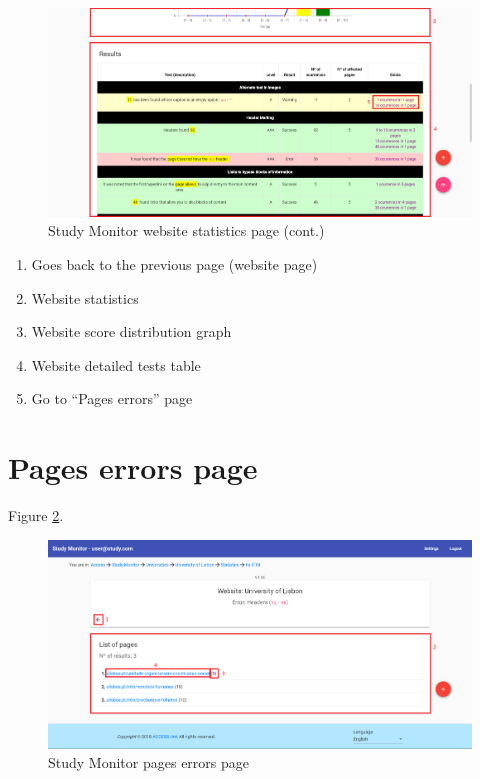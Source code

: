 \begin{figure}[H]
    \centering
    \includegraphics[width=\linewidth]{lib/images/study/study_website_statistics_page_3.png}
    \caption{Study Monitor website statistics page (cont.)}
    \label{fig:study_website_statistics_page_3}
\end{figure}

\begin{enumerate}
    \item Goes back to the previous page (website page)
    \item Website statistics
    \item Website score distribution graph
    \item Website detailed tests table
    \item Go to ``Pages errors'' page
\end{enumerate}

\section{Pages errors page}

Figure \ref{fig:study_pages_errors_page}.

\begin{figure}[H]
    \centering
    \includegraphics[width=\linewidth]{lib/images/study/study_pages_errors_page.png}
    \caption{Study Monitor pages errors page}
    \label{fig:study_pages_errors_page}
\end{figure}

